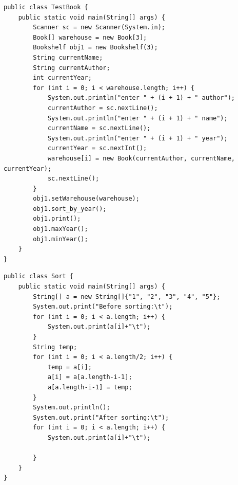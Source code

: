 \documentclass[14pt, a4paper]{extarticle}
\newenvironment{code}{\captionsetup{type=listing}}{}
\begin{document}
\begin{code}
\begin{Verbatim}[frame=single, fontsize=\footnotesize]
public class TestBook {
    public static void main(String[] args) {
        Scanner sc = new Scanner(System.in);
        Book[] warehouse = new Book[3];
        Bookshelf obj1 = new Bookshelf(3);
        String currentName;
        String currentAuthor;
        int currentYear;
        for (int i = 0; i < warehouse.length; i++) {
            System.out.println("enter " + (i + 1) + " author");
            currentAuthor = sc.nextLine();
            System.out.println("enter " + (i + 1) + " name");
            currentName = sc.nextLine();
            System.out.println("enter " + (i + 1) + " year");
            currentYear = sc.nextInt();
            warehouse[i] = new Book(currentAuthor, currentName, currentYear);
            sc.nextLine();
        }
        obj1.setWarehouse(warehouse);
        obj1.sort_by_year();
        obj1.print();
        obj1.maxYear();
        obj1.minYear();
    }
}
\end{Verbatim}
\end{code}

\begin{code}
\begin{Verbatim}[frame=single, fontsize=\footnotesize]
public class Sort {
    public static void main(String[] args) {
        String[] a = new String[]{"1", "2", "3", "4", "5"};
        System.out.print("Before sorting:\t");
        for (int i = 0; i < a.length; i++) {
            System.out.print(a[i]+"\t");
        }
        String temp;
        for (int i = 0; i < a.length/2; i++) {
            temp = a[i];
            a[i] = a[a.length-i-1];
            a[a.length-i-1] = temp;
        }
        System.out.println();
        System.out.print("After sorting:\t");
        for (int i = 0; i < a.length; i++) {
            System.out.print(a[i]+"\t");

        }
    }
}
\end{Verbatim}
\end{code}
\end{document}
